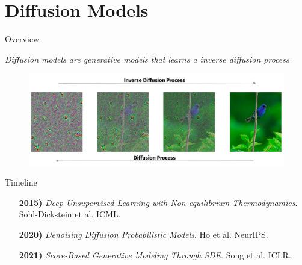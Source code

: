 \documentclass[aspectratio=169, 9pt]{beamer}
\theoremstyle{definition}
\begin{document}
\section{Diffusion Models}
\begin{frame}{Overview}
  \begin{center}
    \it
    Diffusion models are generative models that learns a \textit{inverse
    diffusion process}
  \end{center}
  \begin{figure}[h!]
    \centering
    \includegraphics[scale=0.2]{./pic/diffusion_intro.png}
  \end{figure}
\end{frame}
\begin{frame}{Timeline}
\begin{enumerate}
  \item[\bf 2015)] \textit{Deep Unsupervised Learning with Non-equilibrium
  Thermodynamics}. Sohl-Dickstein et al. ICML.\vfill
  \item[\bf 2020)] \textit{Denoising Diffusion Probabilistic Models}.
  Ho et al. NeurIPS.\vfill
  \item[\bf 2021)] \textit{Score-Based Generative Modeling Through SDE}. Song et
    al. ICLR.
\end{enumerate}
\end{frame}
\end{document}
